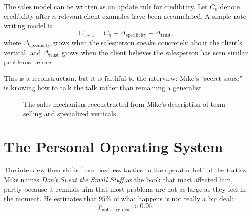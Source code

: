 The sales model can be written as an update rule for credibility. Let \(C_n\) denote credibility after \(n\) relevant client examples have been accumulated. A simple note-writing model is
\begin{equation}
C_{n+1}=C_n+\Delta_{\text{specificity}}+\Delta_{\text{trust}},
\end{equation}
where \(\Delta_{\text{specificity}}\) grows when the salesperson speaks concretely about the client's vertical, and \(\Delta_{\text{trust}}\) grows when the client believes the salesperson has seen similar problems before.

This is a reconstruction, but it is faithful to the interview: Mike's ``secret sauce'' is knowing how to talk the talk rather than remaining a generalist.

\begin{figure}
\centering
{}
\caption{The sales mechanism reconstructed from Mike's description of team selling and specialized verticals.}
\end{figure}

\section{The Personal Operating System}

The interview then shifts from business tactics to the operator behind the tactics. Mike names \emph{Don't Sweat the Small Stuff} as the book that most affected him, partly because it reminds him that most problems are not as large as they feel in the moment. He estimates that \(95\%\) of what happens is not really a big deal:
\begin{equation}
p_{\text{not a big deal}}\approx 0.95.
\end{equation}

